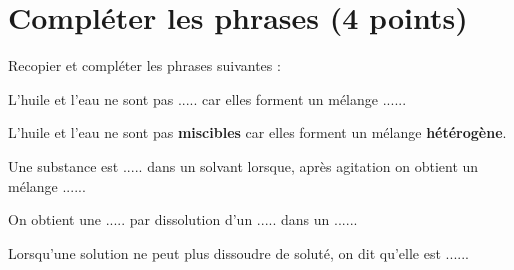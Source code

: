 \section{Compléter les phrases (4 points)}

Recopier et compléter les phrases suivantes :
\begin{questions}
	\question[1] L'huile et l'eau ne sont pas $.....$ car elles forment un mélange $.....$.
	\begin{solution}
		L'huile et l'eau ne sont pas \textbf{miscibles} car elles forment un mélange \textbf{hétérogène}.
	\end{solution}
	
	\question[1] Une substance est $.....$ dans un solvant lorsque, après agitation on obtient un mélange $.....$.
	
	
	\question[1\half] On obtient une $.....$ par dissolution d'un $.....$ dans un $.....$.
	
	\question[\half] Lorsqu'une solution ne peut plus dissoudre de soluté, on dit qu'elle est $.....$.
\end{questions}